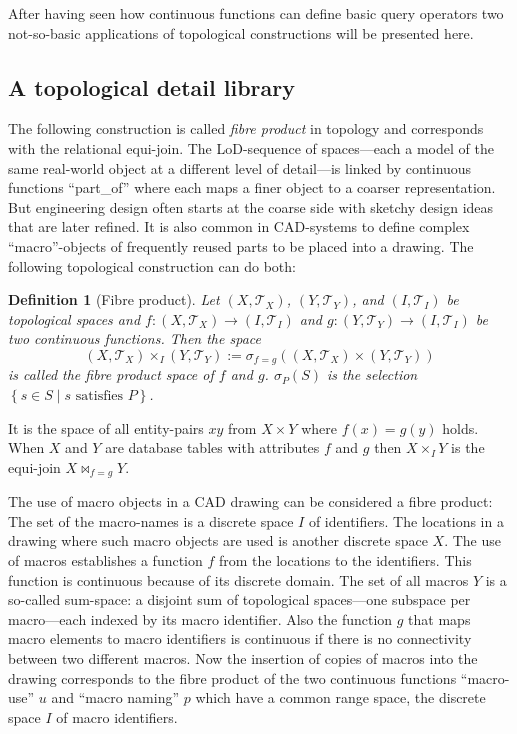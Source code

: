 \documentclass[5p]{elsarticle}
\newtheorem{dfn}{Definition}
\newcommand{\mathpset}[2]{\left\{#1\mid #2\right\}}
\newcommand{\qq}[1]{``#1''}
\begin{document}
After having seen how continuous functions can define basic query operators 
two not-so-basic applications of topological constructions will be presented here.

\subsection{A topological detail library} 

The following construction is called \emph{fibre product} in topology and corresponds 
with the relational equi-join. 
The LoD-sequence of spaces---each a model of the same real-world object at a 
different level of detail---is linked by continuous functions \qq{part\_of} where each 
maps a finer object to a coarser representation. 
But engineering design often starts at the coarse side with sketchy design ideas that are 
later refined. 
It is also common in CAD-systems to define complex \qq{macro}-objects of 
frequently reused parts to be placed into a drawing. 
The following topological construction can do both: 

\begin{sloppy} \begin{dfn}[Fibre product]
Let $(X,\mathcal{T}_X)$, $(Y,\mathcal{T}_Y)$, and $(I,\mathcal{T}_I)$ be topological spaces and 
$f:(X,\mathcal{T}_X)\to(I,\mathcal{T}_I)$  and $g:(Y,\mathcal{T}_Y)\to(I,\mathcal{T}_I)$ be two 
continuous functions. 
Then the space 
$$
  (X,\mathcal{T}_X) \times_I (Y,\mathcal{T}_Y) := 
   \sigma_{f=g}((X,\mathcal{T}_X) \times (Y,\mathcal{T}_Y))
$$
is called the \emph{fibre product space} of $f$ and $g$. $\sigma_P(S)$ is the selection 
$\mathpset{s \in S}{s \text{ satisfies } P}$.
\end{dfn}
\end{sloppy} 

It is the space of all entity-pairs $xy$ from $X\times Y$ where $f(x)= g(y)$ holds. 
When $X$ and $Y$ are database tables with attributes $f$ and $g$ then $X \times_I Y$ is the 
equi-join $X \Join_{f=g} Y$.

The use of macro objects in a CAD drawing can be considered a fibre product: 
The set of the macro-names is a discrete space $I$ of identifiers.  
The locations in a drawing where such macro objects are used is another discrete space $X$. 
The use of macros establishes a function $f$ from the locations to the identifiers. 
This function is continuous because of its discrete domain. 
The set of all macros $Y$ is a so-called sum-space: a disjoint sum of topological spaces---one 
subspace per macro---each indexed by its macro identifier. 
Also the function $g$ that maps macro elements to macro identifiers is continuous if 
there is no connectivity between two different macros. 
Now the insertion of copies of macros into the drawing corresponds to the fibre product of the 
two continuous functions \qq{macro-use} $u$ and \qq{macro naming} $p$ which have a common range 
space, the discrete space $I$ of macro identifiers. 
\end{document}
